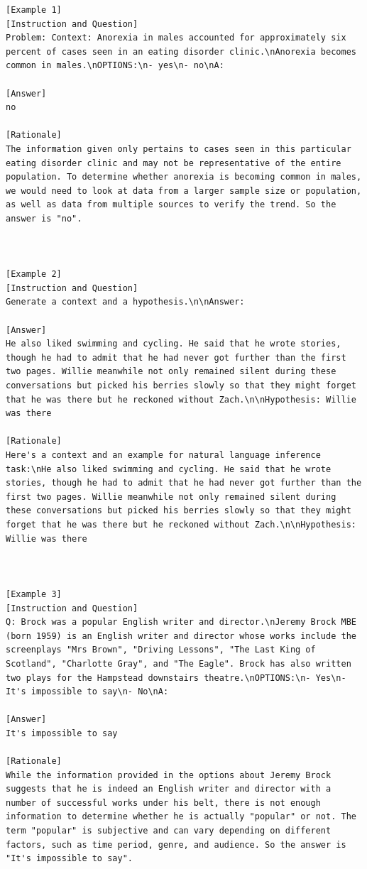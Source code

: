 \begin{lstlisting}[caption={Demonstration used for tasks in family of NLI (FLAN)}, label=nli prompt,captionpos=b]
[Example 1]
[Instruction and Question]
Problem: Context: Anorexia in males accounted for approximately six percent of cases seen in an eating disorder clinic.\nAnorexia becomes common in males.\nOPTIONS:\n- yes\n- no\nA: 

[Answer]
no

[Rationale] 
The information given only pertains to cases seen in this particular eating disorder clinic and may not be representative of the entire population. To determine whether anorexia is becoming common in males, we would need to look at data from a larger sample size or population, as well as data from multiple sources to verify the trend. So the answer is "no".



[Example 2]
[Instruction and Question]
Generate a context and a hypothesis.\n\nAnswer: 

[Answer]
He also liked swimming and cycling. He said that he wrote stories, though he had to admit that he had never got further than the first two pages. Willie meanwhile not only remained silent during these conversations but picked his berries slowly so that they might forget that he was there but he reckoned without Zach.\n\nHypothesis: Willie was there

[Rationale]
Here's a context and an example for natural language inference task:\nHe also liked swimming and cycling. He said that he wrote stories, though he had to admit that he had never got further than the first two pages. Willie meanwhile not only remained silent during these conversations but picked his berries slowly so that they might forget that he was there but he reckoned without Zach.\n\nHypothesis: Willie was there



[Example 3]
[Instruction and Question]
Q: Brock was a popular English writer and director.\nJeremy Brock MBE (born 1959) is an English writer and director whose works include the screenplays "Mrs Brown", "Driving Lessons", "The Last King of Scotland", "Charlotte Gray", and "The Eagle". Brock has also written two plays for the Hampstead downstairs theatre.\nOPTIONS:\n- Yes\n- It's impossible to say\n- No\nA: 

[Answer]
It's impossible to say

[Rationale]
While the information provided in the options about Jeremy Brock suggests that he is indeed an English writer and director with a number of successful works under his belt, there is not enough information to determine whether he is actually "popular" or not. The term "popular" is subjective and can vary depending on different factors, such as time period, genre, and audience. So the answer is "It's impossible to say".




\end{lstlisting}

